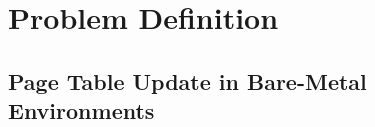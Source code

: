 \section{Problem Definition} \label{sec:prob}
\subsection{Page Table Update in Bare-Metal Environments}

